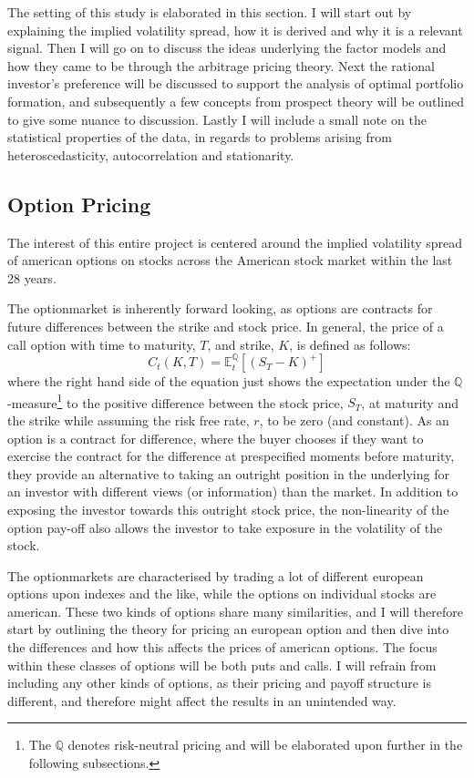 
The setting of this study is elaborated in this section. I will start out by explaining the implied volatility spread, how it is derived and why it is a relevant signal. Then I will go on to discuss the ideas underlying the factor models and how they came to be through the arbitrage pricing theory. Next the rational investor's preference will be discussed to support the analysis of optimal portfolio formation, and subsequently a few concepts from prospect theory will be outlined to give some nuance to discussion. Lastly I will include a small note on the statistical properties of the data, in regards to problems arising from heteroscedasticity, autocorrelation and stationarity.

\subsection{Option Pricing}

The interest of this entire project is centered around the implied volatility spread of american options on stocks across the American stock market within the last 28 years. 

The optionmarket is inherently forward looking, as options are contracts for future differences between the strike and stock price. In general, the price of a call option with time to maturity, $T$, and strike, $K$, is defined as follows:
\begin{equation}
	C_{t}(K,T)=\mathbb{E}_{t}^{\mathbb{Q}}\left[\left(S_{T}-K\right)^{+}\right]
\end{equation}
where the right hand side of the equation just shows the expectation under the $\mathbb{Q}$-measure\footnote{The $\mathbb{Q}$ denotes risk-neutral pricing and will be elaborated upon further in the following subsections.} to the positive difference between the stock price, $S_{T}$, at maturity and the strike while assuming the risk free rate, $r$, to be zero (and constant). As an option is a contract for difference, where the buyer chooses if they want to exercise the contract for the difference at prespecified moments before maturity, they provide an alternative to taking an outright position in the underlying for an investor with different views (or information) than the market. In addition to exposing the investor towards this outright stock price, the non-linearity of the option pay-off also allows the investor to take exposure in the volatility of the stock. 

The optionmarkets are characterised by trading a lot of different european options upon indexes and the like, while the options on individual stocks are american. These two kinds of options share many similarities, and I will therefore start by outlining the theory for pricing an european option and then dive into the differences and how this affects the prices of american options. The focus within these classes of options will be both puts and calls. I will refrain from including any other kinds of options, as their pricing and payoff structure is different, and therefore might affect the results in an unintended way. 


